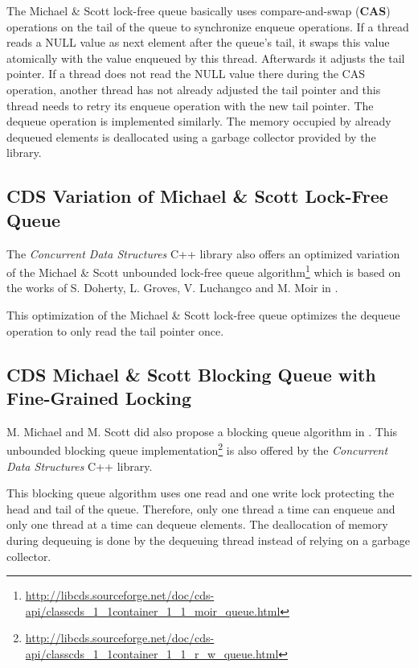     The Michael \& Scott lock-free queue basically uses compare-and-swap (\textbf{CAS}) operations on the tail of the queue to synchronize enqueue operations. If a thread reads a NULL value as next element after the queue's tail, it swaps this value atomically with the value enqueued by this thread. Afterwards it adjusts the tail pointer. If a thread does not read the NULL value there during the CAS operation, another thread has not already adjusted the tail pointer and this thread needs to retry its enqueue operation with the new tail pointer. The dequeue operation is implemented similarly. The memory occupied by already dequeued elements is deallocated using a garbage collector provided by the library.

\subsection[CDS MoirQueue]{CDS Variation of Michael \& Scott Lock-Free Queue} \label{subsec:cds-moir}

    The \textit{Concurrent Data Structures} C++ library also offers an optimized variation of the Michael \& Scott unbounded lock-free queue algorithm\footnote{\url{http://libcds.sourceforge.net/doc/cds-api/classcds\_1\_1container\_1\_1\_moir\_queue.html}} which is based on the works of S. Doherty, L. Groves, V. Luchangco and M. Moir in \cite{Doherty:2004}.

    This optimization of the Michael \& Scott lock-free queue optimizes the dequeue operation to only read the tail pointer once.

\subsection[CDS RWQueue]{CDS Michael \& Scott Blocking Queue with Fine-Grained Locking} \label{subsec:cds-rw}

    M. Michael and M. Scott did also propose a blocking queue algorithm in \cite{Michael:1996}. This unbounded blocking queue implementation\footnote{\url{http://libcds.sourceforge.net/doc/cds-api/classcds\_1\_1container\_1\_1\_r\_w\_queue.html}} is also offered by the \textit{Concurrent Data Structures} C++ library.

    This blocking queue algorithm uses one read and one write lock protecting the head and tail of the queue. Therefore, only one thread a time can enqueue and only one thread at a time can dequeue elements. The deallocation of memory during dequeuing is done by the dequeuing thread instead of relying on a garbage collector.

